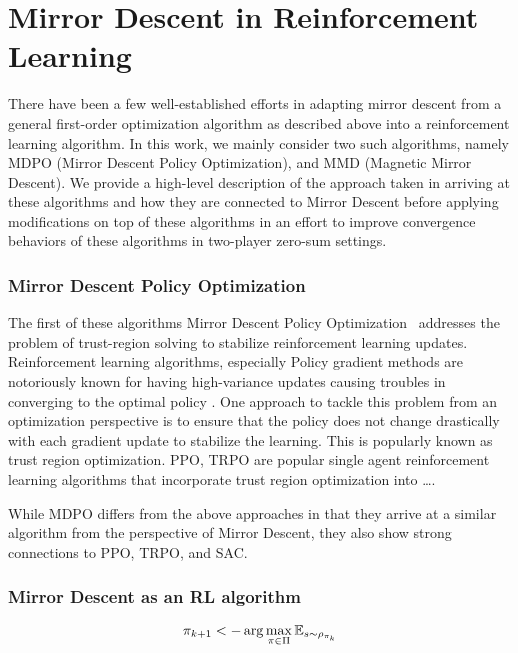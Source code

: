 \chapter{Mirror Descent in Reinforcement Learning}

There have been a few well-established efforts in adapting mirror descent from a general
first-order optimization algorithm as described above into a reinforcement learning algorithm.
In this work, we mainly consider two such algorithms, namely MDPO (Mirror Descent Policy
Optimization), and MMD (Magnetic Mirror Descent).
We provide a high-level description of the approach taken in arriving at these algorithms and how
they are connected to Mirror Descent before applying modifications on top of these algorithms in an
effort to improve convergence behaviors of these algorithms in two-player zero-sum settings.

\subsection[MDPO]{Mirror Descent Policy Optimization}

The first of these algorithms Mirror Descent Policy Optimization~\cite{tomarMirror2022} addresses
the problem of trust-region solving to stabilize reinforcement learning updates.
Reinforcement learning algorithms, especially Policy gradient methods are notoriously known for
having high-variance updates causing troubles in converging to the optimal policy .
One approach to tackle this problem from an optimization perspective is to ensure that the policy
does not change drastically with each gradient update to stabilize the learning.
This is popularly known as trust region optimization.
PPO, TRPO are popular single agent reinforcement learning algorithms that incorporate trust region
optimization into \dots {}.
\cite{schulmanProximal2017}

While MDPO differs from the above approaches in that they arrive at a similar algorithm from the
perspective of Mirror Descent, they also show strong connections to PPO, TRPO, and SAC.

\subsection{Mirror Descent as an RL algorithm}

$$ \pi_{k+1} <- \arg \max_{\pi \in \Pi} \mathbb{E}_{s \sim \rho_{\pi_k}} $$


